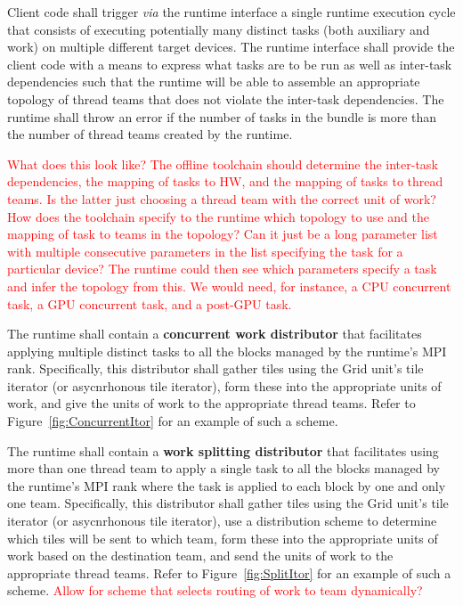 \documentclass{article}
\begin{document}
\begin{req}
Client code shall trigger \textit{via} the runtime interface a single runtime
execution cycle that consists of executing potentially many distinct tasks (both
auxiliary and work) on multiple different target devices.  The runtime interface
shall provide the client code with a means to express what tasks are to be run
as well as inter-task dependencies such that the runtime will be able to
assemble an appropriate topology of thread teams that does not violate the
inter-task dependencies.  The runtime shall throw an error if the number of
tasks in the bundle is more than the number of thread teams created by the
runtime.
\end{req}

\textcolor{red}{What does this look like?  The offline toolchain should
determine the inter-task dependencies, the mapping of tasks to HW, and the
mapping of tasks to thread teams.  Is the latter just choosing a thread team
with the correct unit of work?  How does the toolchain specify to the runtime
which topology to use and the mapping of task to teams in the topology?  Can it
just be a long parameter list with multiple consecutive parameters in the list
specifying the task for a particular device?  The runtime could then see which
parameters specify a task and infer the topology from this.  We would need, for
instance, a CPU concurrent task, a GPU concurrent task, and a post-GPU task.}

\begin{req}
The runtime shall contain a \textbf{concurrent work distributor} that
facilitates applying multiple distinct tasks to all the blocks managed by the
runtime's MPI rank.  Specifically, this distributor shall gather tiles using the
Grid unit's tile iterator (or asycnrhonous tile iterator), form these into the
appropriate units of work, and give the units of work to the appropriate thread
teams.  Refer to Figure~\ref{fig:ConcurrentItor} for an example of such a scheme.
\end{req}

\begin{req}
The runtime shall contain a \textbf{work splitting distributor} that facilitates
using more than one thread team to apply a single task to all the
blocks managed by the runtime's MPI rank where the task is applied to
each block by one and only one team.  Specifically, this distributor shall
gather tiles using the Grid unit's tile iterator (or asycnrhonous tile
iterator), use a distribution scheme to determine which tiles will be sent to
which team, form these into the appropriate units of work based on the
destination team, and send the units of work to the appropriate thread teams.
Refer to Figure~\ref{fig:SplitItor} for an example of such a scheme.
\textcolor{red}{Allow for scheme that selects routing of work to team
dynamically?}
\end{req}
\end{document}
